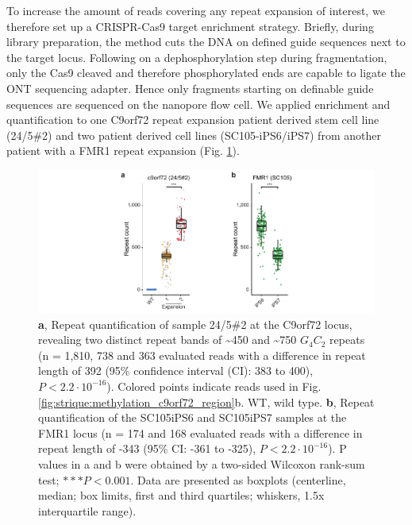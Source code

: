 To increase the amount of reads covering any repeat expansion of interest, we therefore set up a CRISPR-Cas9 target enrichment strategy. Briefly, during library preparation, the method cuts the DNA on defined guide sequences next to the target locus. Following on a dephosphorylation step during fragmentation, only the Cas9 cleaved and therefore phosphorylated ends are capable to ligate the ONT sequencing adapter. Hence only fragments starting on definable guide sequences are sequenced on the nanopore flow cell.
We applied enrichment and quantification to one C9orf72 repeat expansion patient derived stem cell line (24/5\#2) and two patient derived cell lines (SC105-iPS6/iPS7) from another patient with a FMR1 repeat expansion (Fig. \ref{fig:strique:count_patients}).


\begin{figure}[h]
    \centering
    \includegraphics[width=1.0\textwidth]{figures/strique/count_patient_samples.pdf}
    \captionsetup{format=plain}
    \caption[Repeat quantification in C9orf72 and FMR1 patients]{\textbf{a}, Repeat quantification of sample 24/5\#2 at the C9orf72 locus, revealing two distinct repeat bands of \textasciitilde450 and \textasciitilde750 $ G_{4}C_{2} $ repeats (n = 1,810, 738 and 363 evaluated reads with a difference in repeat length of 392 (95\% confidence interval (CI): 383 to 400), $ P < 2.2 \cdot 10^{-16} $). Colored points indicate reads used in Fig. \ref{fig:strique:methylation_c9orf72_region}b. WT, wild type. \textbf{b}, Repeat quantification of the SC105iPS6 and SC105iPS7 samples at the FMR1 locus (n = 174 and 168 evaluated reads with a difference in repeat length of -343 (95\% CI: -361 to -325), $ P < 2.2 \cdot 10^{-16} $). P values in a and b were obtained by a two-sided Wilcoxon rank-sum test; $ ***P < 0.001 $. Data are presented as boxplots (centerline, median; box limits, first and third quartiles; whiskers, 1.5x interquartile range).}
    \label{fig:strique:count_patients}
\end{figure}


